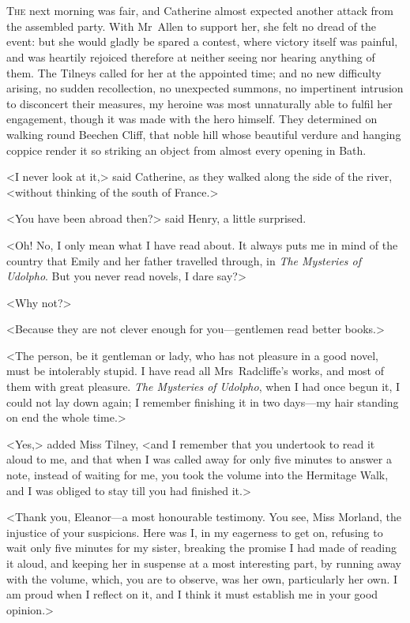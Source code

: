 \chapter[Chapter \thechapter]{} 

 \lettrine{T}{he} next morning was fair, and Catherine almost expected another attack from the assembled party. With Mr~Allen to support her, she felt no dread of the event: but she would gladly be spared a contest, where victory itself was painful, and was heartily rejoiced therefore at neither seeing nor hearing anything of them. The Tilneys called for her at the appointed time; and no new difficulty arising, no sudden recollection, no unexpected summons, no impertinent intrusion to disconcert their measures, my heroine was most unnaturally able to fulfil her engagement, though it was made with the hero himself. They determined on walking round Beechen Cliff, that noble hill whose beautiful verdure and hanging coppice render it so striking an object from almost every opening in Bath. 

 <I never look at it,> said Catherine, as they walked along the side of the river, <without thinking of the south of France.> 

 <You have been abroad then?> said Henry, a little surprised. 

 <Oh! No, I only mean what I have read about. It always puts me in mind of the country that Emily and her father travelled through, in \textit{The Mysteries of Udolpho}. But you never read novels, I dare say?> 

 <Why not?> 

 <Because they are not clever enough for you—gentlemen read better books.> 

 <The person, be it gentleman or lady, who has not pleasure in a good novel, must be intolerably stupid. I have read all Mrs~Radcliffe's works, and most of them with great pleasure. \textit{The Mysteries of Udolpho}, when I had once begun it, I could not lay down again; I remember finishing it in two days—my hair standing on end the whole time.> 

 <Yes,> added Miss Tilney, <and I remember that you undertook to read it aloud to me, and that when I was called away for only five minutes to answer a note, instead of waiting for me, you took the volume into the Hermitage Walk, and I was obliged to stay till you had finished it.> 

 <Thank you, Eleanor—a most honourable testimony. You see, Miss Morland, the injustice of your suspicions. Here was I, in my eagerness to get on, refusing to wait only five minutes for my sister, breaking the promise I had made of reading it aloud, and keeping her in suspense at a most interesting part, by running away with the volume, which, you are to observe, was her own, particularly her own. I am proud when I reflect on it, and I think it must establish me in your good opinion.> 

